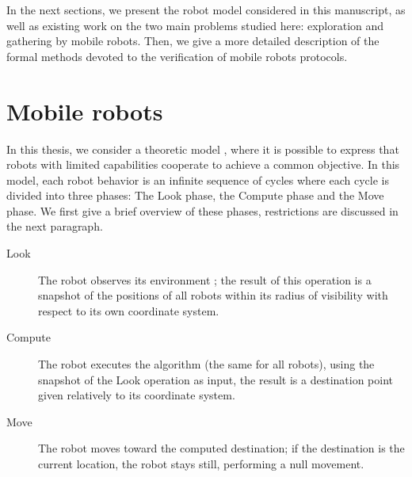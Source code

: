 \bigskip
In the next sections, we present the robot model considered in this manuscript, as well as existing work on the two main problems 
studied here: exploration and gathering by mobile robots. 
Then, we give a more detailed description of the formal methods devoted to the verification of mobile robots protocols. 



	\section{Mobile robots}
In this thesis, we consider a theoretic model \cite{suzuki_distributed_1999,FPS12}, where it is possible to express that robots with limited capabilities 
cooperate to achieve a common objective. 
In this model, each robot behavior is an infinite sequence of cycles where each cycle is divided into three phases: 
The Look phase, the Compute phase and the Move phase.  
We first give a brief overview of these phases, restrictions are discussed in the next paragraph.
\begin{description}
\item [Look] The robot observes its environment ; the result of this operation is a snapshot of the positions of all robots within its radius of visibility with respect to its own coordinate system. 
\item [Compute] The robot executes the algorithm (the same for all robots), using the snapshot of the Look operation as input, the result is a  destination point given relatively to its coordinate system. 
 \item[Move] The robot moves toward the computed destination; if the destination is the current location, the robot stays still, performing a null movement. 
 \end{description}
 
